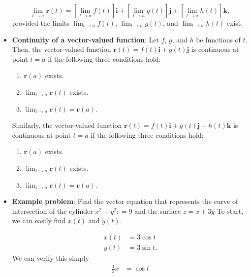 \documentclass{report}
\begin{document}
\begin{itemize}
            \[
                \lim_{t \to a} \mathbf{r}(t) = \left[ \lim_{t \to a} f(t) \right]\mathbf{i} + \left[ \lim_{t \to a} g(t) \right]\mathbf{j} + \left[ \lim_{t \to a} h(t) \right]\mathbf{k},
            \]
            provided the limits  \(\lim_{t \to a} f(t)\), \(\lim_{t \to a} g(t)\), and \(\lim_{t \to a} h(t)\) exist.
        \item \textbf{Continuity of a vector-valued function}:
            Let \(f\), \(g\), and \(h\) be functions of \(t\). Then, the vector-valued function \(\mathbf{r}(t) = f(t)\mathbf{i} + g(t)\mathbf{j}\) is continuous at point \(t = a\) if the following three conditions hold:
            \begin{enumerate}
                \item \(\mathbf{r}(a)\) exists.
                \item \(\lim_{t \to a} \mathbf{r}(t)\) exists.
                \item \(\lim_{t \to a} \mathbf{r}(t) = \mathbf{r}(a)\).
            \end{enumerate}
            \bigbreak \noindent 
            Similarly, the vector-valued function \(\mathbf{r}(t) = f(t)\mathbf{i} + g(t)\mathbf{j} + h(t)\mathbf{k}\) is continuous at point \(t = a\) if the following three conditions hold:
            \begin{enumerate}
                \item \(\mathbf{r}(a)\) exists.
                \item \(\lim_{t \to a} \mathbf{r}(t)\) exists.
                \item \(\lim_{t \to a} \mathbf{r}(t) = \mathbf{r}(a)\).
            \end{enumerate}
        \item \textbf{Example problem}: Find the vector equation that represents the curve of intersection of the cylinder $x^{2} + y^{2}:  = 9 $ and the surface  $z=x+3y$
            \bigbreak \noindent 
            To start, we can easily find $x(t)$ and $y(t)$. 
            \bigbreak \noindent 
            \begin{prop}
               \begin{align*}
                   x(t) &= 3\cos{t} \\
                   y(t) &= 3\sin{t}
               .\end{align*} 
               We can verify this simply
               \begin{align*}
                   \frac{1}{3}x &= \cos{t} \\

\end{align*}
\end{prop}
\end{itemize}
\end{document}
